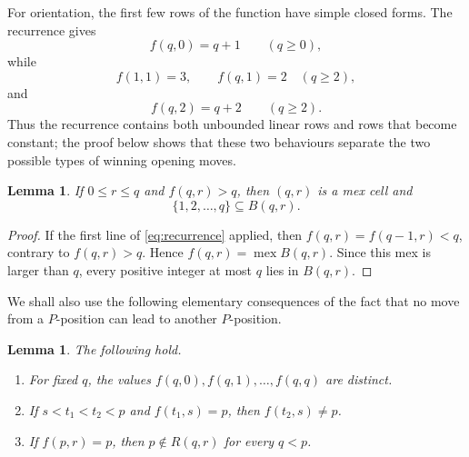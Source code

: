 \documentclass[11pt]{article}
\newtheorem{lemma}[theorem]{Lemma}
\newcommand{\Mex}{\operatorname{mex}}
\begin{document}
For orientation, the first few rows of the function have simple closed forms.
The recurrence gives
\[
        f(q,0)=q+1 \qquad(q\ge 0),
\]
while
\[
        f(1,1)=3,\qquad f(q,1)=2\quad(q\ge 2),
\]
and
\[
        f(q,2)=q+2\qquad(q\ge 2).
\]
Thus the recurrence contains both unbounded linear rows and rows that become
constant; the proof below shows that these two behaviours separate the two
possible types of winning opening moves.

\begin{lemma}\label{lem:mexcell}
If $0\le r\le q$ and $f(q,r)>q$, then $(q,r)$ is a mex cell and
\[
        \{1,2,\ldots,q\}\subseteq B(q,r).
\]
\end{lemma}

\begin{proof}
If the first line of \eqref{eq:recurrence} applied, then
$f(q,r)=f(q-1,r)<q$, contrary to $f(q,r)>q$. Hence
$f(q,r)=\Mex B(q,r)$. Since this mex is larger than $q$, every positive
integer at most $q$ lies in $B(q,r)$.
\end{proof}

We shall also use the following elementary consequences of the fact that no
move from a $P$-position can lead to another $P$-position.

\begin{lemma}\label{lem:nonattacking}
The following hold.
\begin{enumerate}
\item[(a)] For fixed $q$, the values $f(q,0),f(q,1),\ldots,f(q,q)$ are distinct.
\item[(b)] If $s<t_1<t_2<p$ and $f(t_1,s)=p$, then $f(t_2,s)\ne p$.
\item[(c)] If $f(p,r)=p$, then $p\notin R(q,r)$ for every $q<p$.
\end{enumerate}
\end{lemma}
\end{document}
